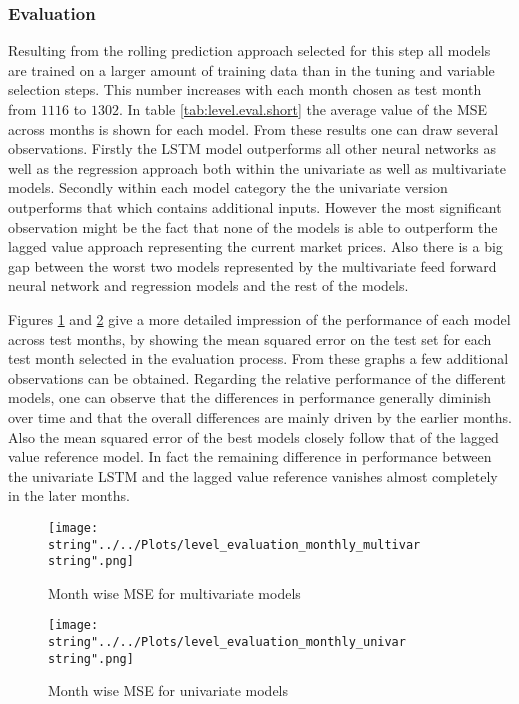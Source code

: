 \subsubsection{Evaluation}
Resulting from the rolling prediction approach selected for this step all models are trained on a larger amount of training data than in the tuning and variable selection steps. This number increases with each month chosen as test month from $1116$ to $1302$. In table \ref{tab:level.eval.short} the average value of the MSE across months is shown for each model. From these results one can draw several observations. Firstly the LSTM model outperforms all other neural networks as well as the regression approach both within the univariate as well as multivariate models. Secondly within each model category the the univariate version outperforms that which contains additional inputs. However the most significant observation  might be the fact that none of the models is able to outperform the lagged value approach representing the current market prices. Also there is a big gap between the worst two models represented by the multivariate feed forward neural network and regression models and the rest of the models.

Figures \ref{fig:level_evaluation_monthly_multivar} and \ref{fig:level_evaluation_monthly_univar} give  a more detailed impression of the performance of each model across test months, by showing the mean squared error on the test set for each test month selected in the evaluation process. From these graphs a few additional observations can be obtained. Regarding the relative performance of the different models, one can observe that the differences in performance generally diminish over time and that the  overall differences are mainly driven by the earlier months. Also the mean squared error of the best models closely follow that of the lagged value reference model. In fact the remaining difference in performance between the univariate LSTM and the lagged value reference vanishes almost completely in the later months.

\begin{figure}[h!]
  \centering
\texttt{[image: \\string"../../Plots/level\_evaluation\_monthly\_multivar\\string".png]}
  \caption{Month wise MSE for multivariate models}\label{fig:level_evaluation_monthly_multivar}
\end{figure}

\begin{figure}[h!]
  \centering
\texttt{[image: \\string"../../Plots/level\_evaluation\_monthly\_univar\\string".png]}
  \caption{Month wise MSE for univariate models}\label{fig:level_evaluation_monthly_univar}
\end{figure}


